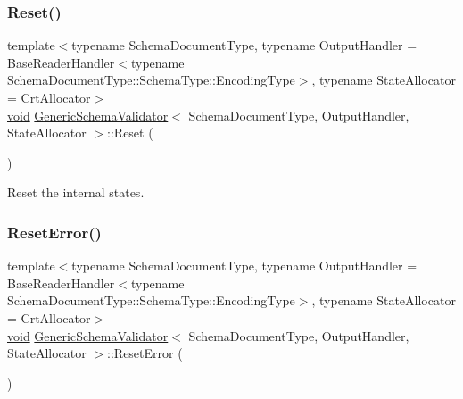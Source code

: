 \mbox{\label{classGenericSchemaValidator_a49efbbe098cb77728be3d48cafed17e4}} 
\subsubsection{\texorpdfstring{Reset()}{Reset()}}
{\footnotesize\ttfamily template$<$typename Schema\+Document\+Type, typename Output\+Handler = Base\+Reader\+Handler$<$typename Schema\+Document\+Type\+::\+Schema\+Type\+::\+Encoding\+Type$>$, typename State\+Allocator = Crt\+Allocator$>$ \\
\hyperlink{imgui__impl__opengl3__loader_8h_ac668e7cffd9e2e9cfee428b9b2f34fa7}{void} \hyperlink{classGenericSchemaValidator}{Generic\+Schema\+Validator}$<$ Schema\+Document\+Type, Output\+Handler, State\+Allocator $>$\+::Reset (\begin{DoxyParamCaption}{ }\end{DoxyParamCaption})\hspace{0.3cm}{\ttfamily [inline]}}



Reset the internal states. 

\mbox{\label{classGenericSchemaValidator_a8374dd359e572f653c49293545ad3ef4}} 
\subsubsection{\texorpdfstring{Reset\+Error()}{ResetError()}}
{\footnotesize\ttfamily template$<$typename Schema\+Document\+Type, typename Output\+Handler = Base\+Reader\+Handler$<$typename Schema\+Document\+Type\+::\+Schema\+Type\+::\+Encoding\+Type$>$, typename State\+Allocator = Crt\+Allocator$>$ \\
\hyperlink{imgui__impl__opengl3__loader_8h_ac668e7cffd9e2e9cfee428b9b2f34fa7}{void} \hyperlink{classGenericSchemaValidator}{Generic\+Schema\+Validator}$<$ Schema\+Document\+Type, Output\+Handler, State\+Allocator $>$\+::Reset\+Error (\begin{DoxyParamCaption}{ }\end{DoxyParamCaption})\hspace{0.3cm}{\ttfamily [inline]}}



